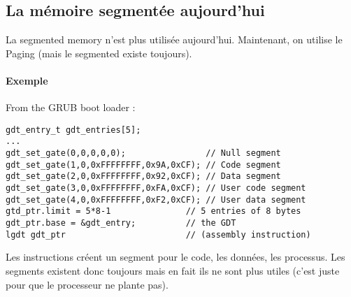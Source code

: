 \subsection{La mémoire segmentée aujourd'hui}

La segmented memory n'est plus utilisée aujourd'hui. Maintenant, on
utilise le Paging (mais le segmented existe toujours). \newline

\begin{framed}
    \paragraph{Exemple} From the GRUB boot loader :

    \begin{verbatim}
gdt_entry_t gdt_entries[5];
...
gdt_set_gate(0,0,0,0,0);                // Null segment
gdt_set_gate(1,0,0xFFFFFFFF,0x9A,0xCF); // Code segment
gdt_set_gate(2,0,0xFFFFFFFF,0x92,0xCF); // Data segment
gdt_set_gate(3,0,0xFFFFFFFF,0xFA,0xCF); // User code segment
gdt_set_gate(4,0,0xFFFFFFFF,0xF2,0xCF); // User data segment
gtd_ptr.limit = 5*8-1               // 5 entries of 8 bytes
gdt_ptr.base = &gdt_entry;          // the GDT
lgdt gdt_ptr                        // (assembly instruction)
    \end{verbatim}
\end{framed}

Les instructions créent un segment pour le code, les données, les
processus. Les segments existent donc toujours mais en fait ils ne sont
plus utiles (c'est juste pour que le processeur ne plante pas). \newline

